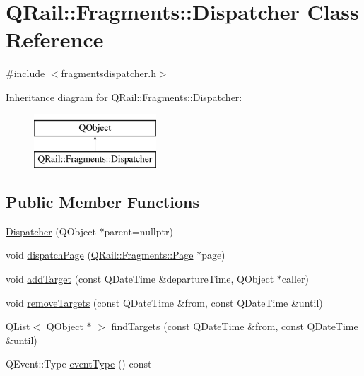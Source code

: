 \hypertarget{classQRail_1_1Fragments_1_1Dispatcher}{}\section{Q\+Rail\+::Fragments\+::Dispatcher Class Reference}
\label{classQRail_1_1Fragments_1_1Dispatcher}


{\ttfamily \#include $<$fragmentsdispatcher.\+h$>$}

Inheritance diagram for Q\+Rail\+::Fragments\+::Dispatcher\+:\begin{figure}[H]
\begin{center}
\leavevmode
\includegraphics[height=2.000000cm]{classQRail_1_1Fragments_1_1Dispatcher}
\end{center}
\end{figure}
\subsection*{Public Member Functions}
\begin{DoxyCompactItemize}
\item 
\mbox{\hyperlink{classQRail_1_1Fragments_1_1Dispatcher_a94fd3786408f4686957fbfe1a7ce02b4}{Dispatcher}} (Q\+Object $\ast$parent=nullptr)
\item 
void \mbox{\hyperlink{classQRail_1_1Fragments_1_1Dispatcher_a8fb45565510e58c75c23131c55127703}{dispatch\+Page}} (\mbox{\hyperlink{classQRail_1_1Fragments_1_1Page}{Q\+Rail\+::\+Fragments\+::\+Page}} $\ast$page)
\item 
void \mbox{\hyperlink{classQRail_1_1Fragments_1_1Dispatcher_a5fcac7c9a26145f0d1907d23c18c60ac}{add\+Target}} (const Q\+Date\+Time \&departure\+Time, Q\+Object $\ast$caller)
\item 
void \mbox{\hyperlink{classQRail_1_1Fragments_1_1Dispatcher_a21d4df9c73acc71f39b5323d79439896}{remove\+Targets}} (const Q\+Date\+Time \&from, const Q\+Date\+Time \&until)
\item 
Q\+List$<$ Q\+Object $\ast$ $>$ \mbox{\hyperlink{classQRail_1_1Fragments_1_1Dispatcher_a45cd97a9172b52a85e40fd941ae8d7ad}{find\+Targets}} (const Q\+Date\+Time \&from, const Q\+Date\+Time \&until)
\item 
Q\+Event\+::\+Type \mbox{\hyperlink{classQRail_1_1Fragments_1_1Dispatcher_acf343b76ab5b5b38c855122052c4f092}{event\+Type}} () const
\end{DoxyCompactItemize}


